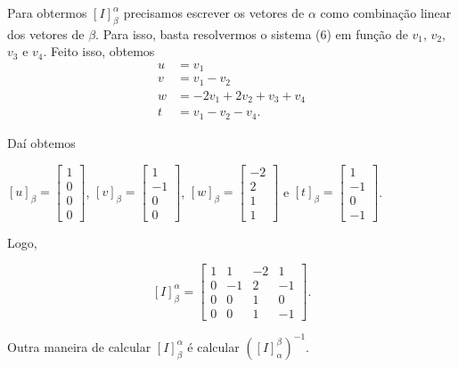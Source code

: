 \begin{enumerate}
Para obtermos  $[I]_{\beta}^{\alpha}$ precisamos escrever os vetores de $\alpha$ como combinação linear dos vetores de $\beta$. Para isso, basta resolvermos o sistema (6) em função de $v_1$, $v_2$, $v_3$ e $v_4$. Feito isso, obtemos
\begin{align*}
u&=v_1  \nonumber\\
v&=v_1-v_2 \\
w&=-2v_1+2v_2+v_3+v_4 \nonumber \\
t&=v_1-v_2-v_4.\nonumber
\end{align*}

Daí obtemos

$[u]_{\beta}=\left[ \begin{array}{c} 1\\ 0\\ 0\\ 0\end{array}\right ]$, $[v]_{\beta}=\left[ \begin{array}{c} 1\\ -1\\ 0\\ 0\end{array}\right ]$, $[w]_{\beta}=\left[ \begin{array}{c} -2\\ 2\\ 1\\ 1\end{array}\right ]$ e $[t]_{\beta}=\left[ \begin{array}{c} 1\\ -1\\ 0\\ -1\end{array}\right ]$.

 Logo,

$$[I]_{\beta}^{\alpha}= \left[ \begin{array}{cccc} 1& 1 &-2 &1\\ 0&-1&2&-1\\ 0&0&1&0\\ 0&0&1&-1\end{array}\right ].$$

Outra maneira de calcular $[I]_{\beta}^{\alpha}$ é calcular $\left( [I]_{\alpha}^{\beta} \right)^{-1}$.

\end{enumerate}

